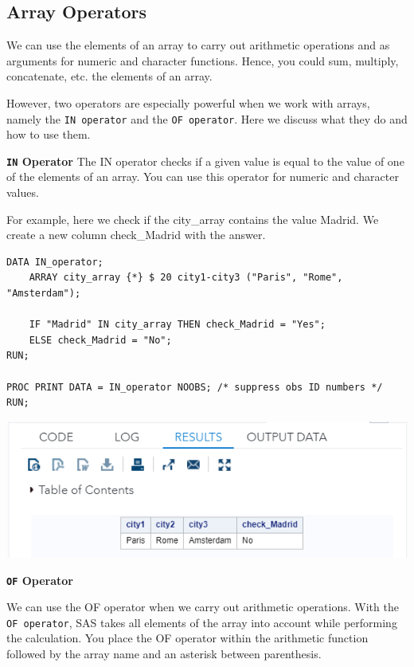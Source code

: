 \documentclass[
]{book}
\begin{document}
\hypertarget{array-operators}{%
\subsection{Array Operators}\label{array-operators}}

We can use the elements of an array to carry out arithmetic operations and as arguments for numeric and character functions. Hence, you could sum, multiply, concatenate, etc. the elements of an array.

However, two operators are especially powerful when we work with arrays, namely the \texttt{IN\ operator} and the \texttt{OF\ operator}. Here we discuss what they do and how to use them.

\textbf{\texttt{IN} Operator}
The IN operator checks if a given value is equal to the value of one of the elements of an array. You can use this operator for numeric and character values.

For example, here we check if the city\_array contains the value Madrid. We create a new column check\_Madrid with the answer.

\begin{verbatim}
DATA IN_operator;
    ARRAY city_array {*} $ 20 city1-city3 ("Paris", "Rome", "Amsterdam");
 
    IF "Madrid" IN city_array THEN check_Madrid = "Yes";
    ELSE check_Madrid = "No";
RUN;
 
PROC PRINT DATA = IN_operator NOOBS; /* suppress obs ID numbers */
RUN;
\end{verbatim}

\begin{center}\includegraphics[width=1\linewidth]{img11/w11-IN-Operator} \end{center}

\textbf{\texttt{OF} Operator}

We can use the OF operator when we carry out arithmetic operations. With the \texttt{OF\ operator}, SAS takes all elements of the array into account while performing the calculation. You place the OF operator within the arithmetic function followed by the array name and an asterisk between parenthesis.
\end{document}
